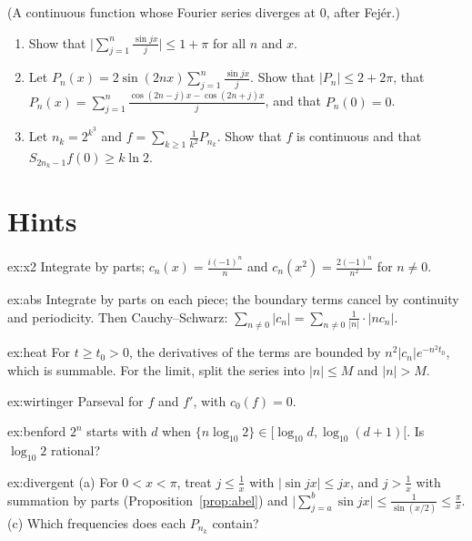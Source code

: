 \begin{exercise}[$\star\star\star$]\label{ex:divergent}
(A continuous function whose Fourier series diverges at $0$, after Fej\'er.)
\begin{enumerate}[label=(\alph*)]
\item Show that $\bigl|\sum_{j=1}^n\frac{\sin jx}j\bigr|\le1+\pi$ for all $n$ and $x$.
\item Let $P_n(x)=2\sin(2nx)\sum_{j=1}^n\frac{\sin jx}j$. Show that $|P_n|\le2+2\pi$, that $P_n(x)=\sum_{j=1}^n\frac{\cos(2n-j)x-\cos(2n+j)x}j$, and that $P_n(0)=0$.
\item Let $n_k=2^{k^3}$ and $f=\sum_{k\ge1}\frac1{k^2}P_{n_k}$. Show that $f$ is continuous and that $S_{2n_k-1}f(0)\ge k\ln2$.
\end{enumerate}
\end{exercise}

\section{Hints}

\begin{hint}{ex:x2}
Integrate by parts; $c_n(x)=\frac{i(-1)^n}n$ and $c_n(x^2)=\frac{2(-1)^n}{n^2}$ for $n\ne0$.
\end{hint}
\begin{hint}{ex:abs}
Integrate by parts on each piece; the boundary terms cancel by continuity and periodicity. Then Cauchy--Schwarz:
$\sum_{n\ne0}|c_n|=\sum_{n\ne0}\frac1{|n|}\cdot|nc_n|$.
\end{hint}
\begin{hint}{ex:heat}
For $t\ge t_0>0$, the derivatives of the terms are bounded by $n^2|c_n|e^{-n^2t_0}$, which is summable. For the limit, split the series
into $|n|\le M$ and $|n|>M$.
\end{hint}
\begin{hint}{ex:wirtinger}
Parseval for $f$ and $f'$, with $c_0(f)=0$.
\end{hint}
\begin{hint}{ex:benford}
$2^n$ starts with $d$ when $\{n\log_{10}2\}\in\bigl[\log_{10}d,\log_{10}(d+1)\bigr[$. Is $\log_{10}2$ rational?
\end{hint}
\begin{hint}{ex:divergent}
(a) For $0<x<\pi$, treat $j\le\frac1x$ with $|\sin jx|\le jx$, and $j>\frac1x$ with summation by parts (Proposition~\ref{prop:abel}) and
$\bigl|\sum_{j=a}^b\sin jx\bigr|\le\frac1{\sin(x/2)}\le\frac\pi x$. (c) Which frequencies does each $P_{n_k}$ contain?
\end{hint}

